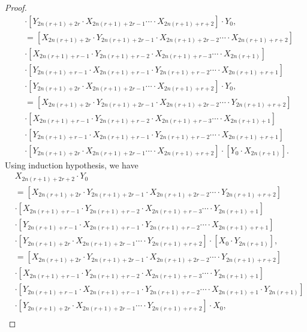 \begin{proof}
\begin{align*}
&\cdot\left[Y_{2n(r+1)+2r}\cdot X_{2n(r+1)+2r-1}\cdots\cdot X_{2n(r+1)+r+2}\right]\cdot Y_{0},\\
&=\left[X_{2n(r+1)+2r}\cdot Y_{2n(r+1)+2r-1}\cdot X_{2n(r+1)+2r-2}\cdots\cdot X_{2n(r+1)+r+2}\right]\\
&\cdot\left[X_{2n(r+1)+r-1}\cdot Y_{2n(r+1)+r-2}\cdot X_{2n(r+1)+r-3}\cdots\cdot X_{2n(r+1)}\right]\\
&\cdot\left[Y_{2n(r+1)+r-1}\cdot X_{2n(r+1)+r-1}\cdot Y_{2n(r+1)+r-2}\cdots\cdot X_{2n(r+1)+r+1}\right]\\&\cdot\left[Y_{2n(r+1)+2r}\cdot X_{2n(r+1)+2r-1}\cdots\cdot X_{2n(r+1)+r+2}\right]\cdot Y_{0},\\
&=\left[X_{2n(r+1)+2r}\cdot Y_{2n(r+1)+2r-1}\cdot X_{2n(r+1)+2r-2}\cdots\cdot Y_{2n(r+1)+r+2}\right]\\
&\cdot\left[X_{2n(r+1)+r-1}\cdot Y_{2n(r+1)+r-2}\cdot X_{2n(r+1)+r-3}\cdots\cdot X_{2n(r+1)+1}\right]\\
&\cdot\left[Y_{2n(r+1)+r-1}\cdot X_{2n(r+1)+r-1}\cdot Y_{2n(r+1)+r-2}\cdots\cdot X_{2n(r+1)+r+1}\right]\\&\cdot\left[Y_{2n(r+1)+2r}\cdot X_{2n(r+1)+2r-1}\cdots\cdot X_{2n(r+1)+r+2}\right]\cdot \left[Y_{0}\cdot X_{2n(r+1)}\right].
	\end{align*}
	Using induction hypothesis, we have
\begin{align*}
&X_{2n(r+1)+2r+2}\cdot Y_{0}\\&=\left[X_{2n(r+1)+2r}\cdot Y_{2n(r+1)+2r-1}\cdot X_{2n(r+1)+2r-2}\cdots\cdot Y_{2n(r+1)+r+2}\right]\\
&\cdot\left[X_{2n(r+1)+r-1}\cdot Y_{2n(r+1)+r-2}\cdot X_{2n(r+1)+r-3}\cdots\cdot Y_{2n(r+1)+1}\right]\\
&\cdot\left[Y_{2n(r+1)+r-1}\cdot X_{2n(r+1)+r-1}\cdot Y_{2n(r+1)+r-2}\cdots\cdot X_{2n(r+1)+r+1}\right]\\&\cdot\left[Y_{2n(r+1)+2r}\cdot X_{2n(r+1)+2r-1}\cdots\cdot Y_{2n(r+1)+r+2}\right]\cdot \left[X_{0}\cdot Y_{2n(r+1)}\right],\\
&=\left[X_{2n(r+1)+2r}\cdot Y_{2n(r+1)+2r-1}\cdot X_{2n(r+1)+2r-2}\cdots\cdot Y_{2n(r+1)+r+2}\right]\\
&\cdot\left[X_{2n(r+1)+r-1}\cdot Y_{2n(r+1)+r-2}\cdot X_{2n(r+1)+r-3}\cdots\cdot Y_{2n(r+1)+1}\right]\\
&\cdot\left[Y_{2n(r+1)+r-1}\cdot X_{2n(r+1)+r-1}\cdot Y_{2n(r+1)+r-2}\cdots\cdot X_{2n(r+1)+1}\cdot Y_{2n(r+1)}\right]\\
&\cdot\left[Y_{2n(r+1)+2r}\cdot X_{2n(r+1)+2r-1}\cdots\cdot Y_{2n(r+1)+r+2}\right]\cdot X_{0},\\

\end{align*}
\end{proof}
